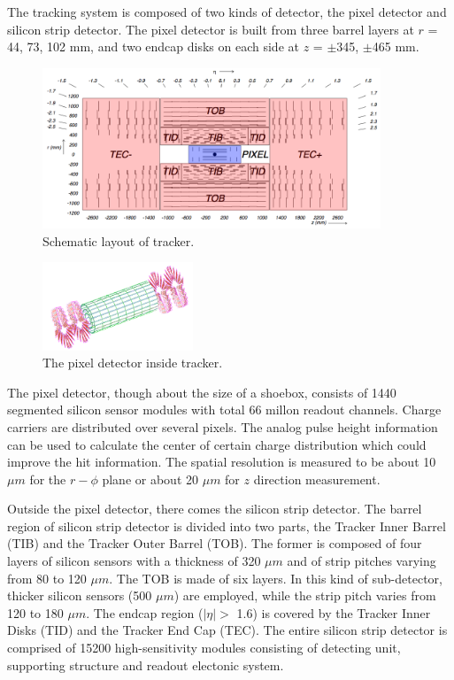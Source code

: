 The tracking system is composed of two kinds of detector, the pixel detector and silicon strip detector. The pixel detector is built from three barrel layers at $r$ = 44, 73, 102 mm, and two endcap disks on each side at $z$ = $\pm$345, $\pm$465 mm.
\begin{figure}[hbtp]
  \begin{center}
    \includegraphics[width=0.9\textwidth]{figure/CH2/tracker.png}
  \end{center}
  \caption{\label{fig:tracker}Schematic layout of tracker.}
\end{figure}
\begin{figure}[hbtp]
  \begin{center}
    \includegraphics[width=0.4\textwidth]{figure/CH2/pixel.png}
  \end{center}
  \caption{\label{fig:pixel}The pixel detector inside tracker.}
\end{figure}
\newline The pixel detector, though about the size of a shoebox, consists of 1440 segmented silicon sensor modules with total 66 millon readout channels. Charge carriers are distributed over several pixels. The analog pulse height information can be used to calculate the center of certain charge distribution which could improve the hit information. The spatial resolution is measured to be about 10 $\mu m$ for the $r-\phi$ plane or about 20 $\mu m$ for $z$ direction measurement.

Outside the pixel detector, there comes the silicon strip detector. The barrel region of silicon strip detector is divided into two parts, the Tracker Inner Barrel (TIB) and the Tracker Outer Barrel (TOB). The former is composed of four layers of silicon sensors with a thickness of 320 $\mu m$ and of strip pitches varying from 80 to 120 $\mu m$. The TOB is made of six layers. In this kind of sub-detector, thicker silicon sensors (500 $\mu m$) are employed, while the strip pitch varies from 120 to 180 $\mu m$. The endcap region ($|\eta| >$ 1.6) is covered by the Tracker Inner Disks (TID) and the Tracker End Cap (TEC). The entire silicon strip detector is comprised of 15200 high-sensitivity modules consisting of detecting unit, supporting structure and readout electonic system.

